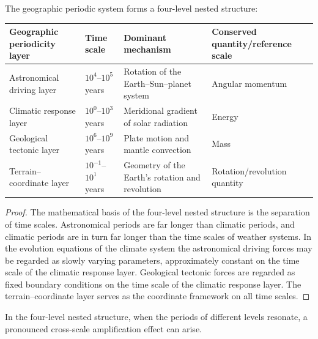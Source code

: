 \begin{theorem}\label{thm:geographic_four_layer}
The geographic periodic system forms a four-level nested structure:
\begin{center}
\begin{tabular}{>{\centering\arraybackslash}p{2.5cm}>{\centering\arraybackslash}p{2.5cm}>{\centering\arraybackslash}p{3cm}>{\centering\arraybackslash}p{2.5cm}}
\toprule
Geographic periodicity layer & Time scale & Dominant mechanism & Conserved quantity/\allowbreak{}reference scale \\
\midrule
Astro\-nomical driving layer & $10^4$--$10^5$ years & Rotation of the Earth--Sun--planet system & Angular momentum \\
Climatic response layer & $10^0$--$10^3$ years & Meridional gradient of solar radiation & Energy \\
Geological tectonic layer & $10^6$--$10^9$ years & Plate motion and mantle convection & Mass \\
Terrain--coordinate layer & $10^{-1}$--$10^1$ years & Geometry of the Earth's rotation and revolution & Rotation/\allowbreak{}revolution quantity \\
\bottomrule
\end{tabular}
\end{center}
\end{theorem}

\begin{proof}
The mathematical basis of the four-level nested structure is the separation of time scales. Astronomical periods are far longer than climatic periods, and climatic periods are in turn far longer than the time scales of weather systems. In the evolution equations of the climate system the astronomical driving forces may be regarded as slowly varying parameters, approximately constant on the time scale of the climatic response layer. Geological tectonic forces are regarded as fixed boundary conditions on the time scale of the climatic response layer. The terrain--coordinate layer serves as the coordinate framework on all time scales.
\end{proof}

\begin{corollary}\label{cor:geographic_cross_scale_resonance}
In the four-level nested structure, when the periods of different levels resonate, a pronounced cross-scale amplification effect can arise.
\end{corollary}

